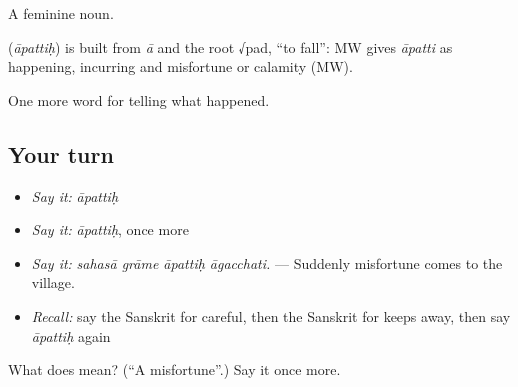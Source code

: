 A feminine noun.

\begin{cousinweb}
\textbf{} (\emph{āpattiḥ}) is built from \emph{ā} and the root √pad, \textquotedblleft{}to fall\textquotedblright{}: MW gives \emph{āpatti} as happening, incurring and misfortune or calamity (MW).
\end{cousinweb}

\begin{grammarlens}[title={What you've built}]
One more word for telling what happened.
\end{grammarlens}

\subsection*{Your turn}
\begin{itemize}
\raggedright
  \item \emph{Say it:} \emph{āpattiḥ}
  \item \emph{Say it:} \emph{āpattiḥ}, once more
  \item \emph{Say it:} \emph{sahasā grāme āpattiḥ āgacchati.} — Suddenly misfortune comes to the village.
  \item \emph{Recall:} say the Sanskrit for careful, then the Sanskrit for keeps away, then say \emph{āpattiḥ} again
\end{itemize}

\begin{tcolorbox}[breakable,colback=teal!4,colframe=teal!35!black,title={Before you move on}]
What does  mean? (\textquotedblleft{}A misfortune\textquotedblright{}.) Say it once more.
\end{tcolorbox}
